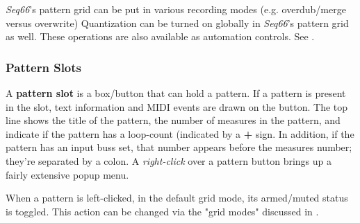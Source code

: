    \textsl{Seq66}'s pattern grid can be put in various recording
   modes (e.g. overdub/merge versus overwrite)
   Quantization can be turned on globally in \textsl{Seq66}'s pattern grid
   as well.
   These operations are also available as automation controls.
   See .


\subsubsection{Pattern Slots}
\label{subsubsec:patterns_pattern_slot}

   A \textbf{pattern slot} is a box/button that can hold a pattern.
   If a pattern is present in the slot, text information and MIDI
   events are drawn on the button.
   The top line shows
   the title of the pattern, the number of measures in the pattern, and
   indicate if the pattern has a loop-count (indicated by a \textbf{+} sign.
   In addition, if the pattern has an input buss set, that number
   appears before the measures number; they're separated by a colon.
   A \textsl{right-click} over a pattern button brings up a fairly extensive
   popup menu.

   When a pattern is left-clicked, in the default grid mode,
   its armed/muted status is toggled.
   This action can be changed via the "grid modes" discussed in
   .

%

